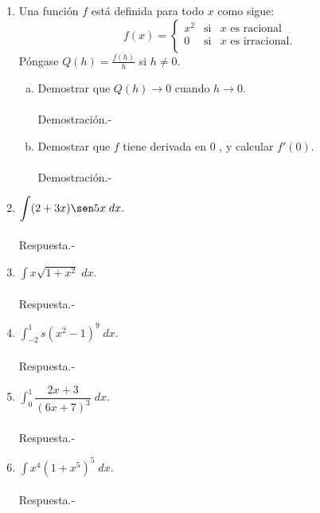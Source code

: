 \begin{enumerate}[\bfseries 1.]
    \item Una función $f$ está definida para todo $x$ como sigue:
    $$
    f(x)=
    \left\{
	\begin{array}{rcl}
	    x^2 & \mbox{si} & x \mbox{ es racional}\\
	    0 & \mbox{si} & x \mbox{ es irracional}.\\
	\end{array}
    \right.
    $$
    Póngase $Q(h)=\frac{f(h)}{h}$ si $h\neq 0.$ 

    \begin{enumerate}[a)]

	\item Demostrar que $Q(h)\to 0$ cuando $h\to 0.$\\\\
	    Demostración.-\;

	\item Demostrar que $f$ tiene derivada en $0$ , y calcular $f'(0)$.\\\\
	    Demostración.-\;

    \end{enumerate}

\item $\displaystyle\int (2+3x)\sen 5x\; dx.$\\\\
	Respuesta.-\;

    \item $\displaystyle\int x \sqrt{1+x^2}\; dx.$\\\\
	Respuesta.-\;

    \item $\displaystyle\int_{-2}^1 s\left(x^2-1\right)^9\; dx.$\\\\
	Respuesta.-\;

    \item $\displaystyle\int_0^1 \dfrac{2x+3}{(6x+7)^3}\; dx.$\\\\
	Respuesta.-\;

    \item $\displaystyle\int x^4\left(1+x^5\right)^5\; dx.$\\\\
	Respuesta.-\; 


\end{enumerate}
